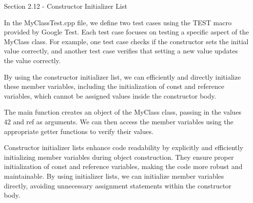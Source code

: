 \begin{notes}{Section 2.12 - Constructor Initializer List}
\begin{highlight}
        In the MyClassTest.cpp file, we define two test cases using the TEST macro provided by Google Test. Each test case focuses on testing a specific aspect of the MyClass class. For example, one test case checks if the constructor sets the initial value correctly, and another test case 
        verifies that setting a new value updates the value correctly.
    
        By using the constructor initializer list, we can efficiently and directly initialize these member variables, including the initialization of const and reference variables, which cannot be assigned values inside the constructor body.
    
        The main function creates an object of the MyClass class, passing in the values 42 and ref as arguments. We can then access the member variables using the appropriate getter functions to verify their values.
    
        Constructor initializer lists enhance code readability by explicitly and efficiently initializing member variables during object construction. They ensure proper initialization of const and reference variables, making the code more robust and maintainable. By using initializer lists, 
        we can initialize member variables directly, avoiding unnecessary assignment statements within the constructor body.
    \end{highlight}
\end{notes}

